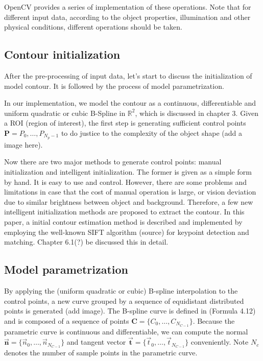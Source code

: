 OpenCV provides a series of implementation of these operations. Note
that for different input data, according to the object properties,
illumination and other physical conditions, different operations
should be taken. 

\subsection{Contour initialization}
\label{sec:mp}

After the pre-processing of input data, let's start to discuss the
initialization of model contour. It is followed by the process of
model parametrization.

In our implementation, we model the
contour as a continuous, differentiable and uniform quadratic or cubic
B-Spline in $\mathbb{R}^2$, which is discussed in chapter 3. 
Given a ROI (region of interest), the first step is generating
sufficient control points $\mathbf{P} = {P_0, \ldots, P_{N_p-1}}$ to
do justice to the complexity of the object shape (add a image here).

Now there are two major methods to generate control points:
manual initialization and intelligent initialization. The former is
given as a simple form by hand. It is easy to use and
control. However, there are some problems and limitations in case that
the cost of manual operation is large, or vision deviation due to
similar brightness between object and background. Therefore, a few new
intelligent initialization methods are proposed to extract the
contour.
In this paper, a initial contour estimation method is described and
implemented by employing the well-known SIFT algorithm (source) for
keypoint detection and matching. Chapter 6.1(?) be discussed this in
detail.

\subsection{Model parametrization}
\label{sec:mp}

By applying the (uniform quadratic or cubic) B-spline interpolation to the control points, a new curve
grouped by a sequence of equidistant distributed points is generated
(add image). The B-spline curve is defined in (Formula 4.12) and is
composed of a sequence of points $\mathbf{C} = \{C_0, \ldots,
C_{N_{C-1}}\}$. Because the parametric curve is continuous and
differentiable, we can compute the normal $\vec{\mathbf{n}} = \{\vec{n}_0, \ldots,
\vec{n}_{N_{C-1}}\}$ and tangent vector $\vec{\mathbf{t}} = \{\vec{t}_0, \ldots, \vec{t}_{N_{C-1}}\}$
conveniently. Note $N_c$ denotes the number of sample points in the
parametric curve.

